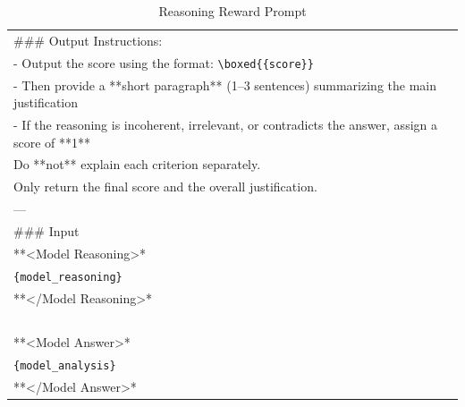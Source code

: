 \begin{table}[htbp]
\begin{tabular}{p{}}
    \#\#\# Output Instructions:\\

    - Output the score using the format: \texttt{\textbackslash boxed\{\{score\}\}}  \\
    - Then provide a **short paragraph** (1–3 sentences) summarizing the main justification  \\
    - If the reasoning is incoherent, irrelevant, or contradicts the answer, assign a score of **1** \\

    Do **not** explain each criterion separately.  \\
    Only return the final score and the overall justification. \\

    --- \\

    \#\#\# Input \\

    **\textless Model Reasoning\textgreater** \\
    \texttt{\{model\_reasoning\}}\\  
    **\textless /Model Reasoning\textgreater**\\
    ~\\
    **\textless Model Answer\textgreater**  \\
    \texttt{\{model\_analysis\}}  \\
    **\textless /Model Answer\textgreater** \\
    \bottomrule
    \end{tabular}
    \caption{Reasoning Reward Prompt}
    \label{tab:ch2:reasoin_reward_prompt}
\end{table}







